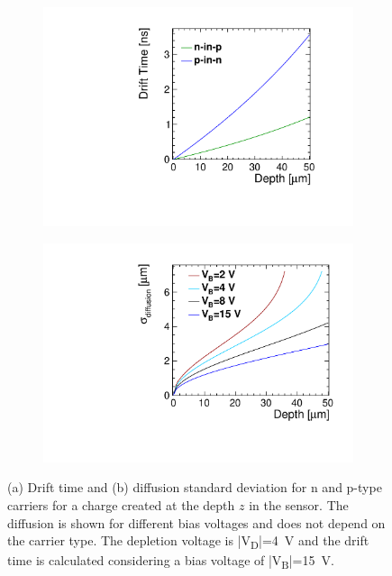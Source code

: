 \begin{figure}[htbp]
  \centering
  \begin{subfigure}[b]{0.45\textwidth}
    \includegraphics[width=\textwidth]{figures/ChargeSharing/DriftTime_n_vs_p_carrier.pdf}
    \caption{}\label{fig:Drift_n_vs_p}
  \end{subfigure}\hfill
  \begin{subfigure}[b]{0.45\textwidth}
    \includegraphics[width=\textwidth]{figures/ChargeSharing/Diffusion_vs_Bias.pdf}
    \caption{}\label{fig:Diffusion_n_vs_p}
  \end{subfigure}
  \caption{(a) Drift time and (b) diffusion standard deviation for n
    and p-type carriers for a charge created at the depth $z$ in the
    sensor. The diffusion is shown for different bias voltages and
    does not depend on the carrier type. The depletion voltage is
    |V\textsubscript{D}|=4~V and the drift time is calculated
    considering a bias voltage of |V\textsubscript{B}|=15~V.}
\end{figure}

